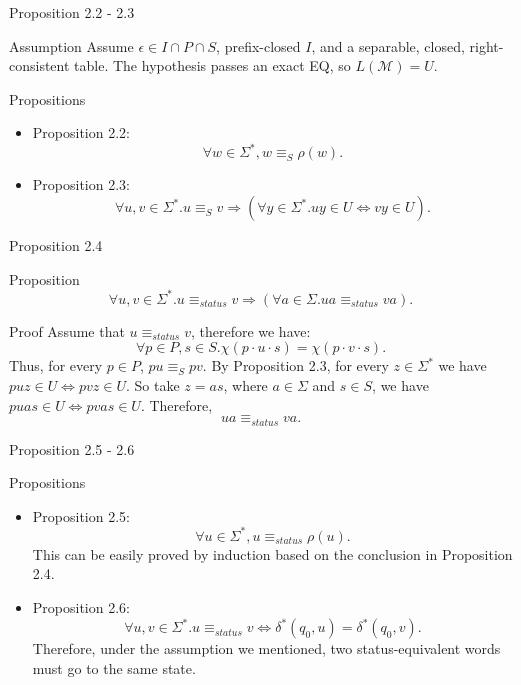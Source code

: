 \documentclass{beamer}
\begin{document}
\begin{frame}{Proposition 2.2 - 2.3}
    \begin{block}{Assumption}
        Assume $\epsilon\in I\cap P\cap S$, prefix-closed $I$, and a
        separable, closed, right-consistent table. The hypothesis passes
        an exact EQ, so $L(\mathcal{M})=U$.
    \end{block}

    \begin{block}{Propositions}
        \begin{itemize}
            \item Proposition 2.2:  
            \[
                \forall w \in \Sigma^*, w \equiv_S \rho(w).
            \]
            \item Proposition 2.3: 
             \[
                \forall u,v \in \Sigma^*. u \equiv_S v \Rightarrow (\forall y \in \Sigma^*. uy \in U \iff vy \in U). 
            \]
        \end{itemize}
    \end{block}
\end{frame}


\begin{frame}{Proposition 2.4}
    \begin{block}{Proposition}
        \[
            \forall u,v \in \Sigma^*. u \equiv_{status} v \Rightarrow (\forall a \in \Sigma. ua \equiv_{status} va).
        \]
    \end{block}
    \begin{block}{Proof}
        Assume that $u \equiv_{status} v$, therefore we have:
         \[
            \forall p\in P,s\in S. \chi(p\cdot u \cdot s) = \chi(p\cdot v \cdot s).
        \]
        Thus, for every $p \in P$, $pu \equiv_{S} pv$.
        By Proposition 2.3, for every $z \in \Sigma^*$ we have $puz \in U \iff pvz \in U$.
        So take $z = as$, where $a \in \Sigma$ and $s \in S$, we have $puas \in U \iff pvas \in U$.
        Therefore,
        \[
            ua \equiv_{status} va.
        \]
    \end{block}
\end{frame}

\begin{frame}{Proposition 2.5 - 2.6}
    \begin{block}{Propositions}
       \begin{itemize}
            \item Proposition 2.5:  
            \[
                \forall u \in \Sigma^*, u \equiv_{status} \rho(u).
            \]
            This can be easily proved by induction based on the conclusion in Proposition 2.4.
            \item Proposition 2.6: 
             \[
                \forall u,v \in \Sigma^*. u \equiv_{status} v \iff \delta^*(q_0,u) = \delta^*(q_0,v).
            \]
            Therefore, under the assumption we mentioned, two status-equivalent words must go to the same state. 
        \end{itemize}
    \end{block}
\end{frame}
\end{document}
